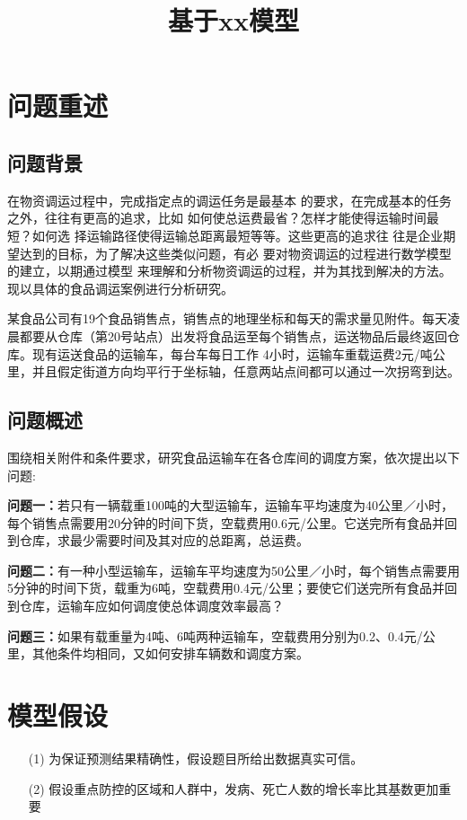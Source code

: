 \documentclass{whutmod}
\title{基于xx模型}
\begin{document}

	\thispagestyle{empty}
	\tableofcontents
	\setcounter{page}{0}                                               
	\newpage	%
	
	\section{问题重述}	
	\subsection{问题背景}
   在物资调运过程中，完成指定点的调运任务是最基本
   的要求，在完成基本的任务之外，往往有更高的追求，比如
   如何使总运费最省？怎样才能使得运输时间最短？如何选
   择运输路径使得运输总距离最短等等。这些更高的追求往
   往是企业期望达到的目标，为了解决这些类似问题，有必
   要对物资调运的过程进行数学模型的建立，以期通过模型
   来理解和分析物资调运的过程，并为其找到解决的方法。
   现以具体的食品调运案例进行分析研究。
    
    某食品公司有19个食品销售点，销售点的地理坐标和每天的需求量见附件。每天凌晨都要从仓库（第20号站点）出发将食品运至每个销售点，运送物品后最终返回仓库。现有运送食品的运输车，每台车每日工作 4小时，运输车重载运费2元/吨公里，并且假定街道方向均平行于坐标轴，任意两站点间都可以通过一次拐弯到达。

	\subsection{问题概述}
    围绕相关附件和条件要求，研究食品运输车在各仓库间的调度方案，依次提出以下问题:
		 
	
	\textbf{问题一：}若只有一辆载重100吨的大型运输车，运输车平均速度为40公里／小时，每个销售点需要用20分钟的时间下货，空载费用0.6元/公里。它送完所有食品并回到仓库，求最少需要时间及其对应的总距离，总运费。
	
	\textbf{问题二：}有一种小型运输车，运输车平均速度为50公里／小时，每个销售点需要用5分钟的时间下货，载重为6吨，空载费用0.4元/公里；要使它们送完所有食品并回到仓库，运输车应如何调度使总体调度效率最高？ 
	
	\textbf{问题三：}如果有载重量为4吨、6吨两种运输车，空载费用分别为0.2、0.4元/公里，其他条件均相同，又如何安排车辆数和调度方案。

	
	\section{模型假设}
	\begin{itemize}                                             
		\item [(1)] 为保证预测结果精确性，假设题目所给出数据真实可信。
		\item [(2)] 假设重点防控的区域和人群中，发病、死亡人数的增长率比其基数更加重要
	\end{itemize}
		
\end{document}
